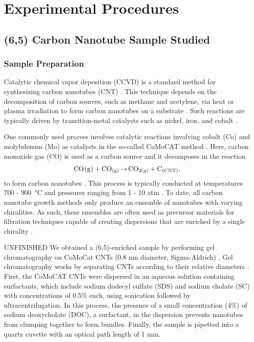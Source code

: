 \chapter{Experimental Procedures}

\section{(6,5) Carbon Nanotube Sample Studied}

\subsection{Sample Preparation}

Catalytic chemical vapor deposition (CCVD) is a standard method for synthesizing carbon nanotubes (CNT) \cite{prasek2011methods, agboola2007conceptual}. This technique depends on the decomposition of carbon sources, such as methane and acetylene, via heat or plasma irradiation to form carbon nanotubes on a substrate \cite{agboola2007conceptual}. Such reactions are typically driven by transition-metal catalysts such as nickel, iron, and cobalt \cite{prasek2011methods}.

One commonly used process involves catalytic reactions involving cobalt (Co) and molybdenum (Mo) as catalysts in the so-called CoMoCAT method \cite{resasco2002scalable}. Here, carbon monoxide gas (CO) is used as a carbon source and it decomposes in the reaction 
\vspace{-2mm}
\begin{equation}
\ce{CO_(g) + CO_{(g)} $\rightarrow$ CO_{2(g)} + C_{(CNT)}},
\end{equation}
to form carbon nanotubes \cite{resasco2002scalable}. This process is typically conducted at temperatures 700 - \SI{900}{\celsius} and pressures ranging from 1 - 10 atm \cite{resasco2002scalable}. To date, all carbon nanotube growth methods only produce an ensemble of nanotubes with varying chiralities. As such, these ensembles are often used as precursor materials for filtration techniques capable of creating dispersions that are enriched by a single chirality \cite{ichinose2017extraction, liu2011large}.

{\color{red} UNFINISHED}
We obtained a (6,5)-enriched sample by performing gel chromatography on CoMoCat CNTs (0.8 nm diameter, Sigma-Aldrich) \cite{ichinose2017extraction}. Gel chromatography  works by separating CNTs according to their relative diameters \cite{ichinose2017extraction}. First, the CoMoCAT CNTs were dispersed in an aqueous solution containing surfactants, which include sodium dodecyl sulfate (SDS) and sodium cholate (SC) with concentrations of 0.5\% each, using sonication followed by ultracentrifugation. In this process, the presence of a small concentration (4\%) of sodium deoxycholate (DOC), a surfactant, in the dispersion prevents nanotubes from clumping together to form bundles. Finally, the sample is pipetted into a quartz cuvette with an optical path length of 1 mm. 

